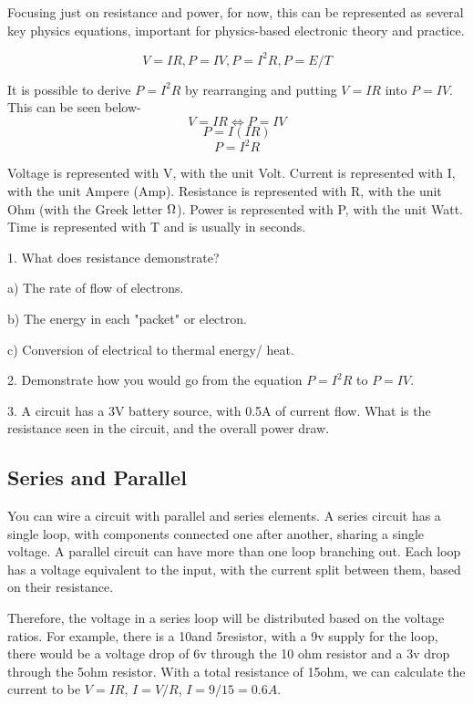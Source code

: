 \documentclass[a4paper,11pt]{report}
\newcommand{\Quiz}[1] %
{
\par\noindent %
\phantomsection %
\todo[inline, color=blue!30]{\textbf{#1}} %
\vspace{1em} %
}
\begin{document}
Focusing just on resistance and power, for now, this can be represented as several key physics equations, important for physics-based electronic theory and practice.

\[V=IR , P=IV , P=I^2R , P=E/T\]

It is possible to derive $P=I^2R$ by rearranging and putting $V=IR$ into $P=IV$. This can be seen below-
\[V=IR \Longleftrightarrow P=IV\]
\[P=I(IR)\]
\[P=I^2R\]

Voltage is represented with V, with the unit Volt. Current is represented with I, with the unit Ampere (Amp). Resistance is represented with R, with the unit Ohm (with the Greek letter $\ohm$). Power is represented with P, with the unit Watt. Time is represented with T and is usually in seconds.

\Quiz{Quiz}

1. What does resistance demonstrate?

a) The rate of flow of electrons.

b) The energy in each "packet" or electron.

c) Conversion of electrical to thermal energy/ heat.

2. Demonstrate how you would go from the equation $P=I^2R$ to $P=IV$.

3. A circuit has a 3V battery source, with 0.5A of current flow. What is the resistance seen in the circuit, and the overall power draw.

\subsection{Series and Parallel}

You can wire a circuit with parallel and series elements. A series circuit has a single loop, with components connected one after another, sharing a single voltage. A parallel circuit can have more than one loop branching out. Each loop has a voltage equivalent to the input, with the current split between them, based on their resistance.

Therefore, the voltage in a series loop will be distributed based on the voltage ratios. For example, there is a 10\ohm and 5\ohm resistor, with a 9v supply for the loop, there would be a voltage drop of 6v through the 10 ohm resistor and a 3v drop through the 5ohm resistor. With a total resistance of 15ohm, we can calculate the current to be $V=IR$, $I=V/R$, $I=9/15=0.6A$.
\end{document}
